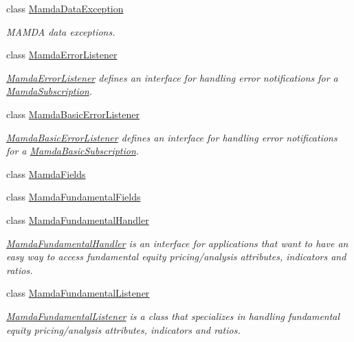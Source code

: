 \begin{CompactItemize}
class \hyperlink{classWombat_1_1MamdaDataException}{Mamda\-Data\-Exception}
\begin{CompactList}\small\item\em MAMDA data exceptions. \item\end{CompactList}\item 
class \hyperlink{classWombat_1_1MamdaErrorListener}{Mamda\-Error\-Listener}
\begin{CompactList}\small\item\em \hyperlink{classWombat_1_1MamdaErrorListener}{Mamda\-Error\-Listener} defines an interface for handling error notifications for a \hyperlink{classWombat_1_1MamdaSubscription}{Mamda\-Subscription}. \item\end{CompactList}\item 
class \hyperlink{classWombat_1_1MamdaBasicErrorListener}{Mamda\-Basic\-Error\-Listener}
\begin{CompactList}\small\item\em \hyperlink{classWombat_1_1MamdaBasicErrorListener}{Mamda\-Basic\-Error\-Listener} defines an interface for handling error notifications for a \hyperlink{classWombat_1_1MamdaBasicSubscription}{Mamda\-Basic\-Subscription}. \item\end{CompactList}\item 
class \hyperlink{classWombat_1_1MamdaFields}{Mamda\-Fields}
\item 
class \hyperlink{classWombat_1_1MamdaFundamentalFields}{Mamda\-Fundamental\-Fields}
\item 
class \hyperlink{classWombat_1_1MamdaFundamentalHandler}{Mamda\-Fundamental\-Handler}
\begin{CompactList}\small\item\em \hyperlink{classWombat_1_1MamdaFundamentalHandler}{Mamda\-Fundamental\-Handler} is an interface for applications that want to have an easy way to access fundamental equity pricing/analysis attributes, indicators and ratios. \item\end{CompactList}\item 
class \hyperlink{classWombat_1_1MamdaFundamentalListener}{Mamda\-Fundamental\-Listener}
\begin{CompactList}\small\item\em \hyperlink{classWombat_1_1MamdaFundamentalListener}{Mamda\-Fundamental\-Listener} is a class that specializes in handling fundamental equity pricing/analysis attributes, indicators and ratios. \item\end{CompactList}\item 

\end{CompactItemize}
